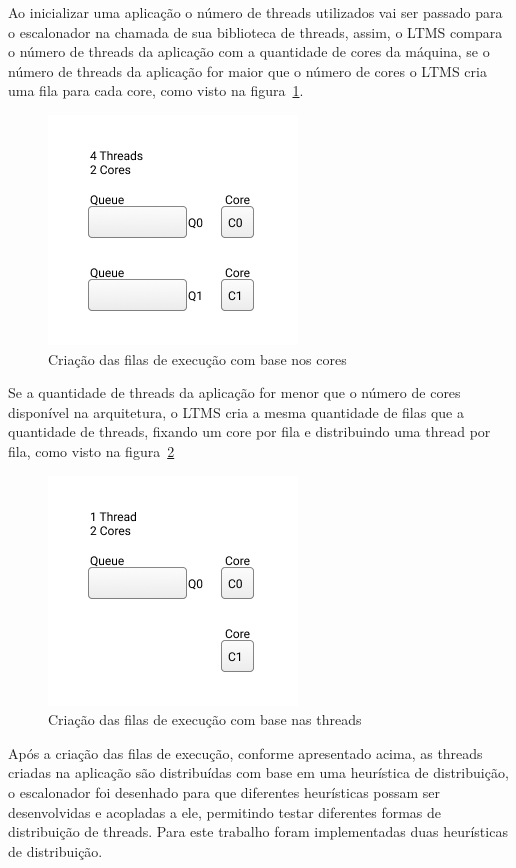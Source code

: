 \documentclass[diss,capa]{texufpel}
\begin{document}
Ao inicializar uma aplicação o número de threads utilizados vai ser passado para o escalonador na chamada de sua biblioteca de threads, assim, o LTMS compara o número de threads da aplicação com a quantidade de cores da máquina, se o número de threads da aplicação for maior que o número de cores o LTMS cria uma fila para cada core, como visto na figura~\ref{queue_core}.

\begin{figure}[htbp]
 \centering
 \includegraphics[scale=.8]{images/Queue_core.png}
 \caption{Criação das filas de execução com base nos cores}
\label{queue_core}
\end{figure}

Se a quantidade de threads da aplicação for menor que o número de cores disponível na arquitetura, o LTMS cria a mesma quantidade de filas que a quantidade de threads, fixando um core por fila e distribuindo uma thread por fila, como visto na figura~\ref{queue_thread}

\begin{figure}[htbp]
 \centering
 \includegraphics[scale=.8]{images/Queues_thread.png}
\caption{Criação das filas de execução com base nas threads}
\label{queue_thread}
\end{figure}

Após a criação das filas de execução, conforme apresentado acima, as threads criadas na aplicação são distribuídas com base em uma heurística de distribuição, o escalonador foi desenhado para que diferentes heurísticas possam ser desenvolvidas e acopladas a ele, permitindo testar diferentes formas de distribuição de threads. Para este trabalho foram implementadas duas heurísticas de distribuição.
\end{document}
